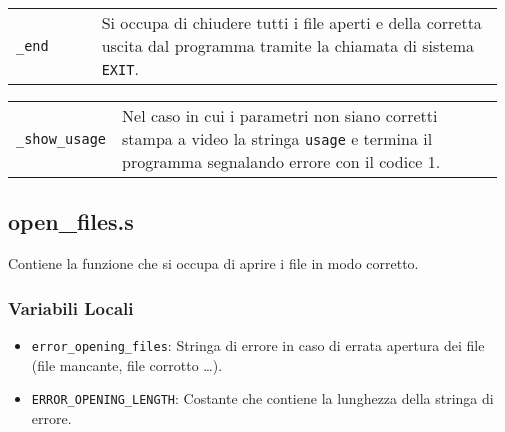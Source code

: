 \documentclass[a4paper,11pt]{article}
\newcommand{\myparagraph}[2]{
	\begin{table}[!ht]
		\begin{tabular}{p{0.17\linewidth} | p{0.8\linewidth}}
			\texttt{#1} & #2
		\end{tabular}
	\end{table}
			}
\begin{document}
		\myparagraph{\_end}{Si occupa di chiudere tutti i file aperti e della corretta uscita dal programma tramite la chiamata di sistema \texttt{EXIT}.}
		
		\myparagraph{\_show\_usage}{Nel caso in cui i parametri non siano corretti stampa a video la stringa \texttt{usage} e termina il programma segnalando errore con il codice 1.}
		
	
	\subsection{open\_files.s}
	Contiene la funzione che si occupa di aprire i file in modo corretto.
	\subsubsection{Variabili Locali} 
	\begin{itemize}
		\item \texttt{error\_opening\_files}: Stringa di errore in caso di errata apertura dei file (file mancante, file corrotto \ldots).
		\item \texttt{ERROR\_OPENING\_LENGTH}: Costante che contiene la lunghezza della stringa di errore.
	\end{itemize}
	
\end{document}
